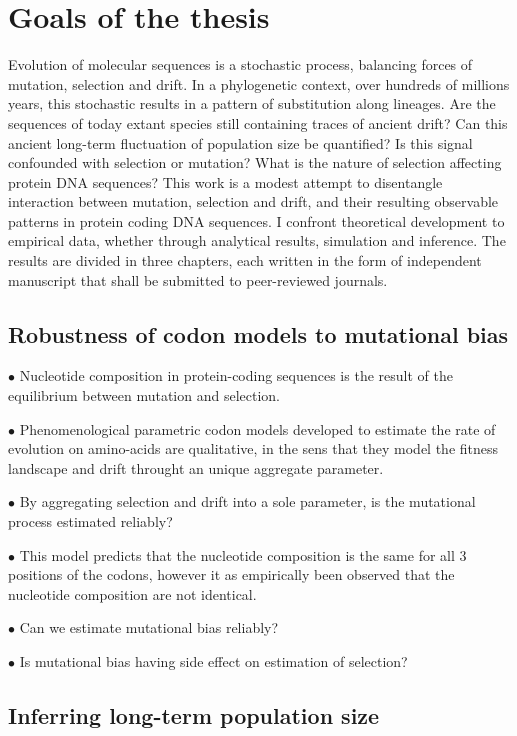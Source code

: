 \chapter{Goals of the thesis}
{\hypersetup{linkcolor=GREYDARK}\minitoc}
\label{chap:goals}

Evolution of molecular sequences is a stochastic process, balancing forces of mutation, selection and drift.
In a phylogenetic context, over hundreds of millions years, this stochastic results in a pattern of substitution along lineages.
Are the sequences of today extant species still containing traces of ancient drift?
Can this ancient long-term fluctuation of population size be quantified?
Is this signal confounded with selection or mutation?
What is the nature of selection affecting protein DNA sequences?
This work is a modest attempt to disentangle interaction between mutation, selection and drift, and their resulting observable patterns in protein coding DNA sequences.
I confront theoretical development to empirical data, whether through analytical results, simulation and inference.
The results are divided in three chapters, each written in the form of independent manuscript that shall be submitted to peer-reviewed journals.

\section{Robustness of codon models to mutational bias}

$\bullet$ Nucleotide composition in protein-coding sequences is the result of the equilibrium between mutation and selection.

$\bullet$ Phenomenological parametric \gls{codon} models developed to estimate the rate of evolution on amino-acids are qualitative, in the sens that they model the fitness landscape and drift throught an unique aggregate parameter.

$\bullet$ By aggregating selection and drift into a sole parameter, is the mutational process estimated reliably?

$\bullet$ This model predicts that the nucleotide composition is the same for all $3$ positions of the codons, however it as empirically been observed that the nucleotide composition are not identical.

$\bullet$ Can we estimate mutational bias reliably?

$\bullet$ Is mutational bias having side effect on estimation of selection?

\section{Inferring long-term population size}

